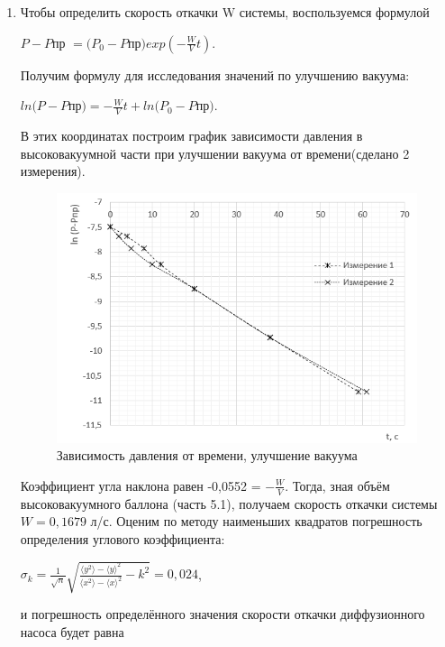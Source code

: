 \documentclass[a4paper]{article}
\begin{document}
\begin{enumerate}
\begin{table}[h]
\begin{tabular}{ |p{0.5cm}|p{1cm}|p{0.5cm}|p{1cm}|p{0.5cm}|p{1cm}|p{0.5cm}|p{1cm}|  }
 \hline
\end{tabular}

\end{table}
    \item Чтобы определить скорость откачки W системы, воспользуемся формулой
    \begin{center}
    $P - P$пр $= (P_0 - P$пр$)exp(-\frac{W}{V}t)$.
    \end{center}
    Получим формулу для исследования значений по улучшению вакуума:
    \begin{center}
    $ln(P - P$пр$) = -\frac{W}{V}t + ln(P_0 - P$пр$)$.
    \end{center}
    В этих координатах построим график зависимости давления в высоковакуумной части при улучшении вакуума от времени(сделано 2 измерения).
    
\begin{figure}[h]
    \centering
    \includegraphics[width=\textwidth]{graph1.PNG}
    \caption{Зависимость давления от времени, улучшение вакуума}
    \label{fig:vac}
\end{figure}

    Коэффициент угла наклона равен -0,0552 = $-\frac{W}{V}$. Тогда, зная объём высоковакуумного баллона (часть 5.1), получаем скорость откачки системы $W = 0,1679$ л/с. Оценим по методу наименьших квадратов погрешность определения углового коэффициента:
\begin{center}
$\sigma_k = \frac{1}{\sqrt{n}}\sqrt{\frac{\langle y^2 \rangle - \langle y \rangle ^2}{\langle x^2 \rangle - \langle x \rangle ^2} - k^2} = 0,024$,
\end{center}

и погрешность определённого значения скорости откачки диффузионного насоса будет равна


\end{enumerate}
\end{document}
